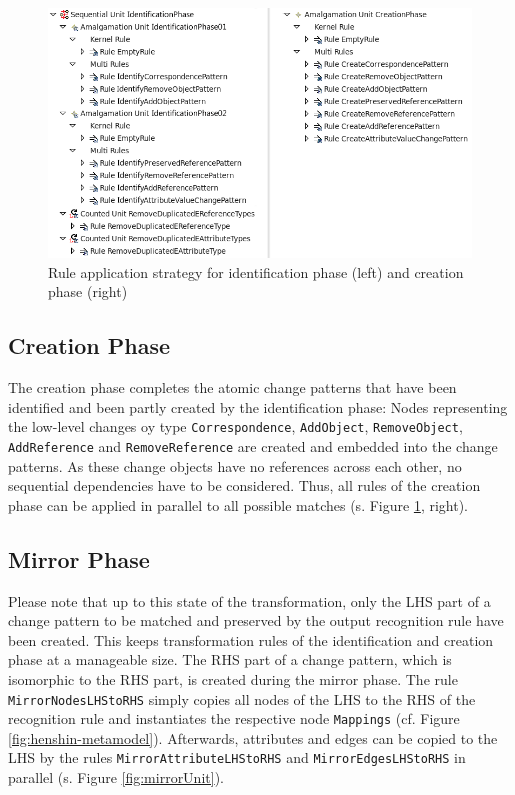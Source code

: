 \documentclass{llncs}
\begin{document}
 
\begin{figure}[h!]
	\centering
	\includegraphics[scale=0.6]{pic/IdentificationAndCreateUnit.png}
	\caption{Rule application strategy for identification phase (left) and creation phase (right)}
	\label{fig:identification-and-creationUnit}
\end{figure}



\subsection{Creation Phase}
The creation phase completes the atomic change patterns that 
have been identified and been partly created by the identification phase: 
Nodes representing the low-level changes oy type \texttt{Correspondence},
\texttt{AddObject}, \texttt{RemoveObject}, \texttt{AddReference} and \texttt{RemoveReference} 
are created and embedded into 
the change patterns.
As these change objects have no references across each other,
no sequential dependencies have to be considered. Thus, all
rules of the creation phase can be applied in parallel to
all possible matches (s. Figure \ref{fig:identification-and-creationUnit}, right).




\subsection{Mirror Phase}

Please note that up to this state of the transformation,
only the LHS part of a change pattern to be
matched and preserved by the output recognition rule have
been created. This keeps transformation rules
of the identification and creation phase at a manageable size.
The RHS part of a change pattern, which is isomorphic
to the RHS part, is created during the mirror phase.
The rule \texttt{MirrorNodesLHStoRHS} simply copies all nodes
of the LHS to the RHS of the recognition rule and
instantiates the respective node \texttt{Mappings} (cf. Figure \ref{fig:henshin-metamodel}).
Afterwards, attributes and edges can be copied to the LHS
by the rules \texttt{MirrorAttributeLHStoRHS} and \texttt{MirrorEdgesLHStoRHS}
in parallel (s. Figure \ref{fig:mirrorUnit}).
\end{document}
